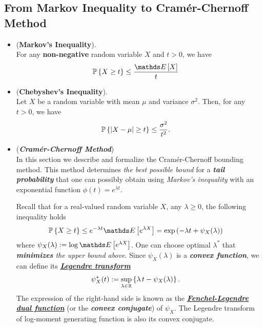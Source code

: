 \documentclass[11pt]{article}
\begin{document}
\subsection{From Markov Inequality to Cram\'er-Chernoff Method}
\begin{itemize}
\item 
\begin{proposition} (\textbf{Markov's Inequality}). \citep{vershynin2018high}\\
For any \textbf{non-negative} random variable $X$ and $t > 0$, we have
\begin{align}
\bP\set{X \ge t} &\le \frac{\E{}{X}}{t} \label{ineqn: markov_inequality}
\end{align}
\end{proposition}

\item \begin{proposition} (\textbf{Chebyshev's Inequality}). \citep{vershynin2018high}\\
Let $X$ be a random variable with mean $\mu$ and variance $\sigma^2$. Then, for any $t > 0$, we have
\begin{align}
{\mathbb P}\left\{\left\lvert X - \mu \right\rvert \ge t\right\} &\le \frac{\sigma^2}{t^2}. \label{ineqn: chebyshev_inequality}
\end{align}
\end{proposition}

\item \begin{remark}(\textbf{\emph{Cram\'er-Chernoff Method}})\\
In this section we describe and formalize the Cram{\'e}r-Chernoff bounding method. This method determines \emph{the best possible bound} for a \emph{\textbf{tail probability}} that one can possibly obtain using \emph{Markov's inequality} with an exponential function $\phi(t) = e^{\lambda t}$.

Recall that for a real-valued random variable $X$, any $\lambda \ge 0$, the following inequality holds
\begin{align*}
\bP\set{X \ge t} &\le e^{-\lambda t} \E{}{e^{\lambda X}} = \exp\paren{-\lambda t + \psi_{X}(\lambda) }
\end{align*} where $\psi_{X}(\lambda) := \log   \E{}{e^{\lambda X}}$. One can choose optimal $\lambda^{*}$ that \emph{\textbf{minimizes} the upper bound above}.
Since $\psi_{X}(\lambda)$ is a \emph{\textbf{convex function}}, we can define its \underline{\emph{\textbf{Legendre transform}}}
\begin{align*}
\psi^{*}_{X}(t) &:= \sup_{\lambda \in {\mathbb R}}\left\{\lambda\,t - \psi_{X}(\lambda)\right\}.
\end{align*} The expression of the right-hand side is known as the \underline{\emph{\textbf{Fenchel-Legendre dual function}}} (or the \textbf{\emph{convex conjugate}}) of $\psi_{X}$. The Legendre transform of log-moment generating function is also its convex conjugate. %


\end{remark}
\end{itemize}
\end{document}
